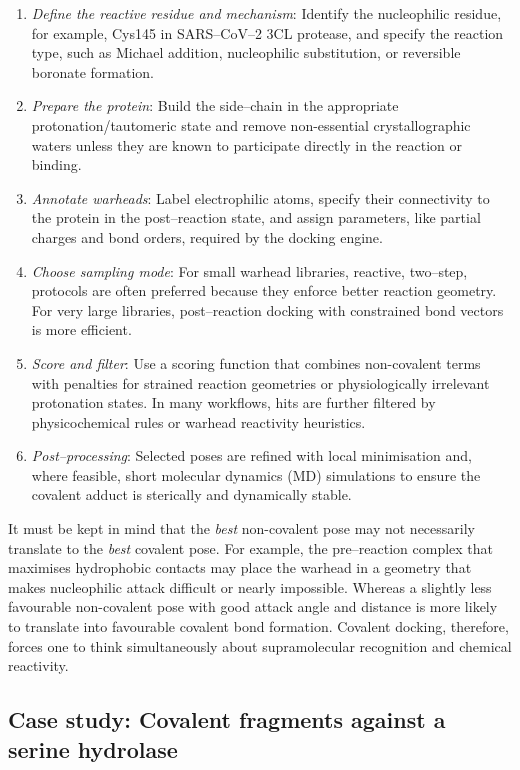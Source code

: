 \documentclass[12pt]{article}
\begin{document}
\begin{enumerate}
  \item \emph{Define the reactive residue and mechanism}: Identify the nucleophilic residue, for example, Cys145 in SARS–CoV–2 3CL protease\cite{CH14_Gu3CL}, and specify the reaction type, such as Michael addition, nucleophilic substitution, or reversible boronate formation.  
  \item \emph{Prepare the protein}: Build the side–chain in the appropriate protonation/tautomeric state and remove non-essential crystallographic waters unless they are known to participate directly in the reaction or binding.  
  \item \emph{Annotate warheads}: Label electrophilic atoms, specify their connectivity to the protein in the post–reaction state, and assign parameters, like partial charges and bond orders, required by the docking engine.  
  \item \emph{Choose sampling mode}: For small warhead libraries, reactive, two–step, protocols are often preferred because they enforce better reaction geometry. For very large libraries, post–reaction docking with constrained bond vectors is more efficient.  
  \item \emph{Score and filter}: Use a scoring function that combines non-covalent terms with penalties for strained reaction geometries or physiologically irrelevant protonation states. In many workflows, hits are further filtered by physicochemical rules or warhead reactivity heuristics.  
  \item \emph{Post–processing}: Selected poses are refined with local minimisation and, where feasible, short molecular dynamics (MD) simulations to ensure the covalent adduct is sterically and dynamically stable.
\end{enumerate}

It must be kept in mind that the \emph{best} non-covalent pose may not necessarily translate to the \emph{best} covalent pose.  For example, the pre–reaction complex that maximises hydrophobic contacts may place the warhead in a geometry that makes nucleophilic attack difficult or nearly impossible. Whereas a slightly less favourable non-covalent pose with good attack angle and distance is more likely to translate into favourable covalent bond formation. Covalent docking, therefore, forces one to think simultaneously about supramolecular recognition and chemical reactivity.

\subsection{Case study: Covalent fragments against a serine hydrolase}
\end{document}
